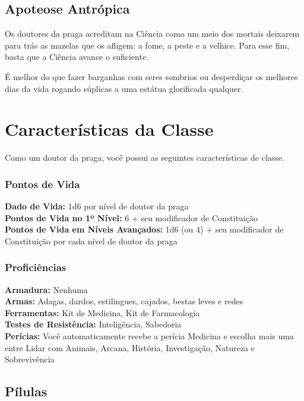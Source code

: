 \documentclass[letterpaper,twocolumn,openany]{dndbook}
\begin{document}
	\subsection{Apoteose Antrópica}
	Os doutores da praga acreditam na Ciência como um meio dos mortais deixarem para trás as mazelas que os afligem: a fome, a peste e a velhice. Para esse fim, basta que a Ciência avance o suficiente.
	
	É melhor do que fazer barganhas com seres sombrios ou desperdiçar os melhores dias da vida rogando súplicas a uma estátua glorificada qualquer.
	
	\section{Características da Classe}
	Como um doutor da praga, você possui as seguintes características de classe.
	
	\subsubsection{Pontos de Vida}
	\noindent\textbf{Dado de Vida:} 1d6 por nível de doutor da praga \\
	\noindent\textbf{Pontos de Vida no 1º Nível:} 6 + seu modificador de Constituição \\
	\noindent\textbf{Pontos de Vida em Níveis Avançados:} 1d6 (ou 4) + seu modificador de Constituição por cada nível de doutor da praga \\
	
	\subsubsection{Proficiências}
	\noindent\textbf{Armadura:} Nenhuma \\
	\noindent\textbf{Armas:} Adagas, dardos, estilingues, cajados, bestas leves e redes \\
	\noindent\textbf{Ferramentas:} Kit de Medicina, Kit de Farmacologia \\
	\noindent\textbf{Testes de Resistência:} Inteligência, Sabedoria \\
	\noindent\textbf{Perícias:} Você automaticamente recebe a perícia Medicina e escolha mais uma entre Lidar com Animais, Arcana, História, Investigação, Natureza e Sobrevivência \\
	
	\subsection{Pílulas}
	
\end{document}
